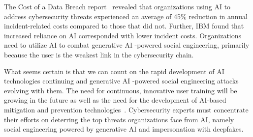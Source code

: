 The Cost of a Data Breach report~\citep{ibm_Cost_Data_Breach_Report_2024} revealed that organizations using AI to address cybersecurity threats experienced an average of 45\% reduction in annual incident-related costs compared to those that did not. Further, IBM found that increased reliance on AI corresponded with lower incident costs. Organizations need to utilize AI to combat generative AI -powered social engineering, primarily because the user is the weakest link in the cybersecurity chain.

What seems certain is that we can count on the rapid development of AI technologies continuing and generative AI -powered social engineering attacks evolving with them. The need for continuous, innovative user training will be growing in the future as well as the need for the development of AI-based mitigation and prevention technologies~\citep{mirsky_Threat_Offensive_AI_Organizations_2023}. Cybersecurity experts must concentrate their efforts on deterring the top threats organizations face from AI, namely social engineering powered by generative AI and impersonation with deepfakes.
